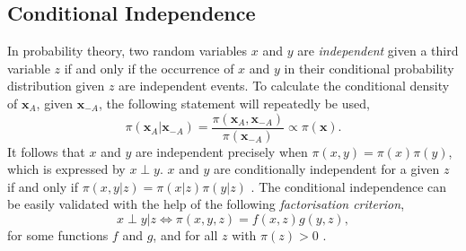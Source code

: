 \subsection{Conditional Independence}
In probability theory, two random variables $x$ and $y$ are \textit{independent} given a third variable $z$ if and only if the occurrence of $x$ and $y$ in their conditional probability distribution given $z$ are independent events. To calculate the conditional density of $\pmb{x}_A$, given $\pmb{x}_{-A}$, the following statement will repeatedly be used,
\begin{equation}
    \pi\left(\pmb{x}_A|\pmb{x}_{-A}\right)=\frac{\pi\left(\pmb{x}_A,\pmb{x}_{-A}\right)}{\pi\left(\pmb{x}_{-A}\right)}\propto \pi\left(\pmb{x}\right).
\end{equation}
It follows that $x$ and $y$ are independent precisely when $\pi\left(x,y\right)=\pi\left(x\right)\pi\left(y\right)$, which is expressed by $x\perp y$. $x$ and $y$ are conditionally independent for a given $z$ if and only if $\pi\left(x,y|z\right)=\pi\left(x|z\right)\pi\left(y|z\right)$ \autocite[][]{dawid1979conditional}. The conditional independence can be easily validated with the help of the following \textit{factorisation criterion},
\begin{equation}
    x\perp y|z\Longleftrightarrow \pi\left(x,y,z\right)=f\left(x,z\right)g\left(y,z\right),
\end{equation}
for some functions $f$ and $g$, and for all $z$ with $\pi\left(z\right) >0$ \autocite[][16--17]{rue2005gaussian}.
